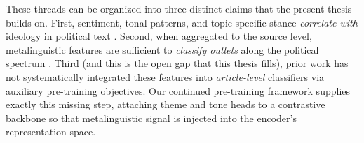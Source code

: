 These threads can be organized into three distinct claims that the present thesis builds on. First, sentiment, tonal patterns, and topic-specific stance \emph{correlate with} ideology in political text \citep{mullen2006preliminary, smirnova2017ideology, bhatia2018topic, bestvater2023sentiment}. Second, when aggregated to the source level, metalinguistic features are sufficient to \emph{classify outlets} along the political spectrum \citep{ronnback2025biasoutlets}. Third (and this is the open gap that this thesis fills), prior work has not systematically integrated these features into \emph{article-level} classifiers via auxiliary pre-training objectives. Our continued pre-training framework supplies exactly this missing step, attaching theme and tone heads to a contrastive backbone so that metalinguistic signal is injected into the encoder's representation space.
